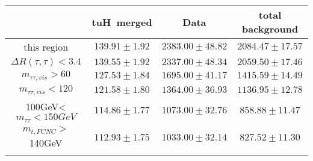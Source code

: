 \begin{tabular}{cccc} \toprule\toprule
 & tuH~merged & Data & total background\\\midrule
this region & $139.91\pm1.92$ & $2383.00\pm48.82$ & $2084.47\pm17.57$\\
$\Delta R(\tau,\tau)<3.4$ & $139.55\pm1.92$ & $2337.00\pm48.34$ & $2059.50\pm17.46$\\
$m_{\tau\tau,vis}>60$ & $127.53\pm1.84$ & $1695.00\pm41.17$ & $1415.59\pm14.49$\\
$m_{\tau\tau,vis}<120$ & $121.58\pm1.80$ & $1364.00\pm36.93$ & $1136.95\pm12.78$\\
100GeV<$m_{\tau\tau}<150GeV$ & $114.86\pm1.77$ & $1073.00\pm32.76$ & $858.88\pm11.47$\\
$m_{t,FCNC}>$140GeV & $112.93\pm1.75$ & $1033.00\pm32.14$ & $827.52\pm11.30$\\
\bottomrule\bottomrule\\
\end{tabular}
